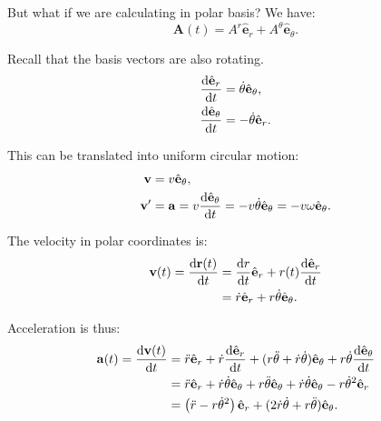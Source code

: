 \documentclass[10pt]{article}
\begin{document}
	But what if we are calculating in polar basis? We have:
	\begin{equation}
	  \mathbf{A}(t) = A^{r} \hat{\mathbf{e}}_r + A^{\theta} \hat{\mathbf{e}}_\theta.
	\end{equation}

	Recall that the basis vectors are also rotating.
	\begin{equation}
	  \begin{aligned}
	  \dv{\hat{\mathbf{e}}_r}{t} &= \dot{\theta}\hat{\mathbf{e}}_\theta, \\
	  \dv{\hat{\mathbf{e}}_\theta}{t} &= -\dot{\theta}\hat{\mathbf{e}}_r.
	  \end{aligned}
	\end{equation}

	This can be translated into uniform circular motion:
	\begin{equation}
	  \begin{aligned}
	  \mathbf{v} &= v \hat{\mathbf{e}}_\theta, \\
	  \mathbf{v}' &= \mathbf{a} = v\dv{\hat{\mathbf{e}}_\theta}{t} = -v\dot{\theta} \hat{\mathbf{e}}_\theta = -v \omega \hat{\mathbf{e}}_\theta.
	  \end{aligned}
	\end{equation}

	The velocity in polar coordinates is:
	\begin{equation}
	  \begin{aligned}
		\mathbf{v}(t) = \dv{\mathbf{r}(t)}{t} &= \dv{r}{t}\hat{\mathbf{e}}_r + r(t)\dv{\hat{\mathbf{e}}_r}{t} \\
		&= \dot{r}\hat{\mathbf{e}}_r + r\dot{\theta}\hat{\mathbf{e}}_\theta.
	  \end{aligned}
	\end{equation}

	Acceleration is thus:
	\begin{equation}
	  \begin{aligned}
		\mathbf{a}(t) = \dv{\mathbf{v}(t)}{t} &= \ddot{r}\hat{\mathbf{e}}_r + \dot{r}\dv{\hat{\mathbf{e}}_r}{t} + (r\ddot{\theta}+\dot{r}\dot{\theta})\hat{\mathbf{e}}_\theta + r\dot{\theta}\dv{\hat{\mathbf{e}}_\theta}{t}\\
		&= \ddot{r}\hat{\mathbf{e}}_r + \dot{r}\dot{\theta}\hat{\mathbf{e}}_\theta + {r}\ddot{\theta} \hat{\mathbf{e}}_\theta + \dot{r}\dot{\theta}\hat{\mathbf{e}}_\theta- r\dot{\theta}^{2}\hat{\mathbf{e}}_r \\
		&= \left( \ddot{r} - r\dot{\theta}^{2} \right)\hat{\mathbf{e}}_r + (2\dot{r}\dot{\theta} + r\ddot{\theta})\hat{\mathbf{e}}_\theta. 
	  \end{aligned}
	\end{equation}
\end{document}
